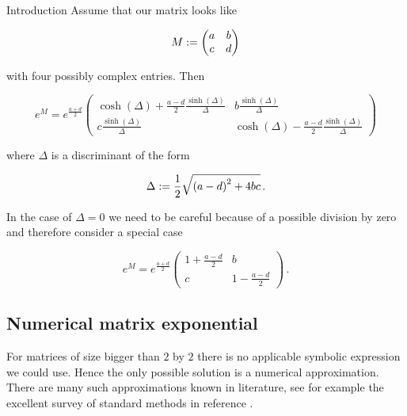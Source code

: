 \begin{chapter}{Introduction}
Assume that our matrix looks like

\begin{equation}
  M :=
  \begin{pmatrix}
    a & b\\
    c & d
  \end{pmatrix}
\end{equation}

with four possibly complex entries. Then

\begin{equation} \label{eq:symbolic_matrix_exp}
  e^M = e^{\frac{a + d}{2}}
  \begin{pmatrix}
    \cosh \left( \Delta \right) + \frac{a - d}{2}  \frac{\sinh \left( \Delta \right)}{\Delta} & b \frac{\sinh \left( \Delta \right)}{\Delta} \\
    c \frac{\sinh \left( \Delta \right)}{\Delta} & \cosh \left( \Delta \right) - \frac{a - d}{2}  \frac{\sinh \left( \Delta \right)}{\Delta}
  \end{pmatrix}
\end{equation}

where $\Delta$ is a discriminant of the form

\begin{equation}
  \Delta := \frac{1}{2} \sqrt{\left( a - d \right)^2 + 4 bc} \,.
\end{equation}

In the case of $\Delta=0$ we need to be careful because of a possible division by
zero and therefore consider a special case

\begin{equation}
e^M = e^{\frac{a + d}{2}}
  \begin{pmatrix}
    1 + \frac{a - d}{2} & b \\
    c & 1 - \frac{a - d}{2}
  \end{pmatrix} \,.
\end{equation}

\subsection{Numerical matrix exponential}

For matrices of size bigger than $2$ by $2$ there is no applicable symbolic expression
we could use. Hence the only possible solution is a numerical approximation. There
are many such approximations known in literature, see for example the excellent
survey of standard methods in reference \cite{moler_nineteen, moler_nineteen_later}.


\end{chapter}
